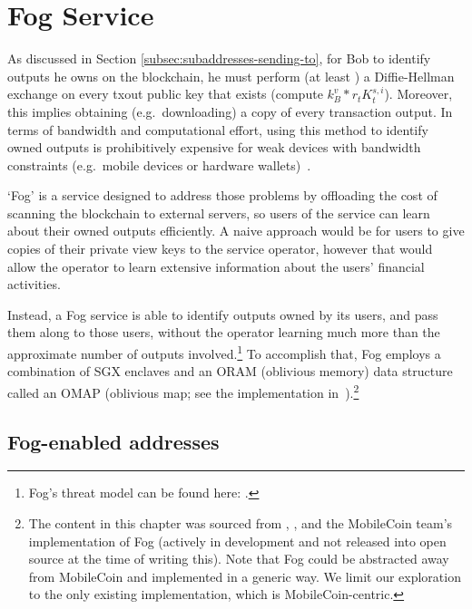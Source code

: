 \chapter{Fog Service}
\label{chapter:fog-service}

As discussed in Section \ref{subsec:subaddresses-sending-to}, for Bob to identify outputs he owns on the blockchain, he must perform (at least \cite{reduce-scan-times-view-tag-research-issue-73}) a Diffie-Hellman exchange on every txout public key that exists (compute $k_B^v*r_t K_t^{s,i}$). Moreover, this implies obtaining (e.g.\ downloading) a copy of every transaction output. In terms of bandwidth and computational effort, using this method to identify owned outputs is prohibitively expensive for weak devices with bandwidth constraints (e.g.\ mobile devices or hardware wallets)~\cite{mobilecoin-whitepaper}.

`Fog' is a service designed to address those problems by offloading the cost of scanning the blockchain to external servers, so users of the service can learn about their owned outputs efficiently. A naive approach would be for users to give copies of their private view keys to the service operator, however that would allow the operator to learn extensive information about the users' financial activities.

Instead, a Fog service is able to identify outputs owned by its users, and pass them along to those users, without the operator learning much more than the approximate number of outputs involved.\footnote{Fog's threat model can be found here: \cite{mobilecoin-fog-threat-model}.} To accomplish that, Fog employs a combination of SGX enclaves and an ORAM (oblivious memory) data structure called an OMAP (oblivious map; see the implementation in~\cite{mobilecoin-omap-source-code}).\footnote{The content in this chapter was sourced from \cite{privacy-properties-mobilecoin-fog}, \cite{mobilecoin-fog-rfc-fog-without-user-table}, and the MobileCoin team's implementation of Fog (actively in development and not released into open source at the time of writing this). Note that Fog could be abstracted away from MobileCoin and implemented in a generic way. We limit our exploration to the only existing implementation, which is MobileCoin-centric.}



\section{Fog-enabled addresses}
\label{sec:fog-enabled-addresses}

